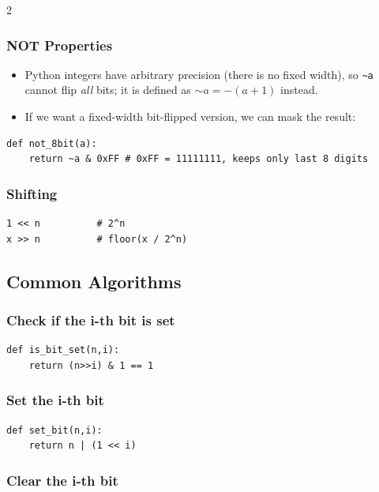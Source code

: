 \documentclass[9pt,a4paper]{extarticle}
\begin{document}
\begin{multicols}{2}
\subsubsection{NOT Properties}

\begin{itemize}
\item Python integers have arbitrary precision (there is no fixed width), so \texttt{\textasciitilde{}a} cannot flip \emph{all} bits; it is defined as ${\sim}a = -(a + 1)$ instead.
\item If we want a fixed-width bit-flipped version, we can mask the result:
\end{itemize}

\begin{lstlisting}
def not_8bit(a):
    return ~a & 0xFF # 0xFF = 11111111, keeps only last 8 digits
\end{lstlisting}

\subsubsection{Shifting}

\begin{lstlisting}
1 << n          # 2^n
x >> n          # floor(x / 2^n)
\end{lstlisting}

\subsection{Common Algorithms}

\subsubsection{Check if the i-th bit is set}

\begin{lstlisting}
def is_bit_set(n,i):
    return (n>>i) & 1 == 1
\end{lstlisting}

\subsubsection{Set the i-th bit}

\begin{lstlisting}
def set_bit(n,i):
    return n | (1 << i)
\end{lstlisting}

\subsubsection{Clear the i-th bit}


\end{multicols}
\end{document}
